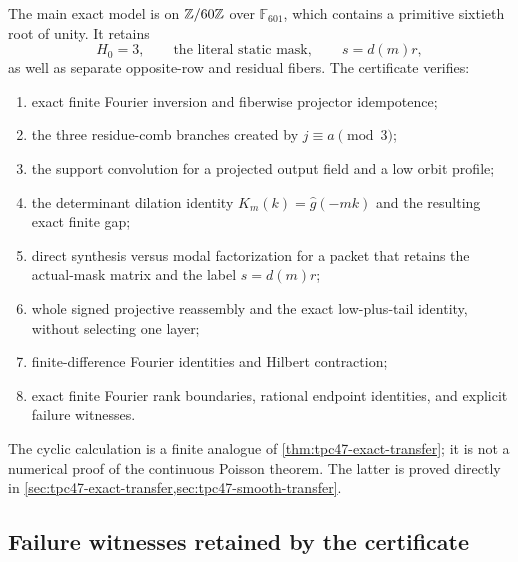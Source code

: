 The main exact model is on \(\mathbb Z/60\mathbb Z\) over \(\mathbb F_{601}\),
which contains a primitive sixtieth root of unity.  It retains
\begin{equation}
 H_0=3,
 \qquad
 \text{the literal static mask},
 \qquad
 s=d(m)r,
 \label{eq:tpc47-certificate-data}
\end{equation}
as well as separate opposite-row and residual fibers.  The certificate
verifies:
\begin{enumerate}[label=\textup{(\roman*)},leftmargin=2.4em]
 \item exact finite Fourier inversion and fiberwise projector
       idempotence;
 \item the three residue-comb branches created by
       \(j\equiv a\pmod3\);
 \item the support convolution for a projected output field and a
       low orbit profile;
 \item the determinant dilation identity
       \(K_m(k)=\widehat g(-mk)\) and the resulting exact finite gap;
 \item direct synthesis versus modal factorization for a packet that
       retains the actual-mask matrix and the label \(s=d(m)r\);
 \item whole signed projective reassembly and the exact low-plus-tail
       identity, without selecting one layer;
 \item finite-difference Fourier identities and Hilbert contraction;
 \item exact finite Fourier rank boundaries, rational endpoint
       identities, and explicit failure witnesses.
\end{enumerate}

The cyclic calculation is a finite analogue of
\cref{thm:tpc47-exact-transfer}; it is not a numerical proof of the
continuous Poisson theorem.  The latter is proved directly in
\cref{sec:tpc47-exact-transfer,sec:tpc47-smooth-transfer}.

\subsection{Failure witnesses retained by the certificate}


